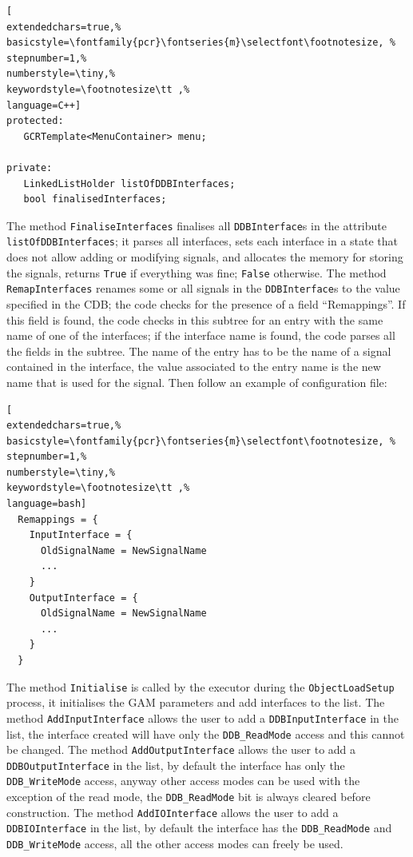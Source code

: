 \begin{lstlisting}[
extendedchars=true,%
basicstyle=\fontfamily{pcr}\fontseries{m}\selectfont\footnotesize, %
stepnumber=1,%
numberstyle=\tiny,%
keywordstyle=\footnotesize\tt ,%
language=C++]
protected:
   GCRTemplate<MenuContainer> menu;

private:
   LinkedListHolder listOfDDBInterfaces;
   bool finalisedInterfaces;
\end{lstlisting}

The method \texttt{FinaliseInterfaces} finalises all \texttt{DDBInterface}s in the attribute \texttt{listOfDDBInterfaces}; it parses all interfaces, sets each interface in a state that does not allow adding or modifying signals, and allocates the memory for storing the signals, returns \texttt{True} if everything was fine; \texttt{False} otherwise.
The method \texttt{RemapInterfaces} renames some or all signals in the \texttt{DDBInterface}s to the value specified in the CDB; the code checks for the presence of a field ``Remappings''. If this field is found, the code checks in this subtree for an entry with the same name of one of the interfaces; if the interface name is found, the code parses all the fields in the subtree. The name of the entry has to be the name of a signal contained in the interface, the value associated to the entry name is the new name that is used for the signal. Then follow an example of configuration file:

\begin{lstlisting}[
extendedchars=true,%
basicstyle=\fontfamily{pcr}\fontseries{m}\selectfont\footnotesize, %
stepnumber=1,%
numberstyle=\tiny,%
keywordstyle=\footnotesize\tt ,%
language=bash]
  Remappings = {
    InputInterface = {
      OldSignalName = NewSignalName
      ...
    }
    OutputInterface = {
      OldSignalName = NewSignalName
      ...
    }
  }
\end{lstlisting}

The method \texttt{Initialise} is called by the executor during the \texttt{ObjectLoadSetup} process, it initialises the GAM parameters and add interfaces to the list.
The method \texttt{AddInputInterface} allows the user to add a \texttt{DDBInputInterface} in the list, the interface created will have only the \texttt{DDB\_ReadMode} access and this cannot be changed.
The method \texttt{AddOutputInterface} allows the user to add a \texttt{DDBOutputInterface} in the list, by default the interface has only the \texttt{DDB\_WriteMode} access, anyway other access modes can be used with the exception of the read mode, the \texttt{DDB\_ReadMode} bit is always cleared before construction.
The method \texttt{AddIOInterface} allows the user to add a \texttt{DDBIOInterface} in the list, by default the interface has the \texttt{DDB\_ReadMode} and \texttt{DDB\_WriteMode} access, all the other access modes can freely be used.

